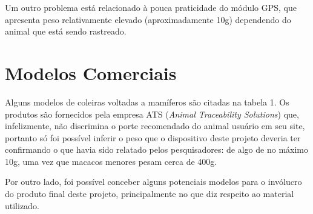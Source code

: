 Um outro problema está relacionado à pouca praticidade do módulo GPS, que apresenta peso relativamente elevado (aproximadamente 10g) dependendo do animal que está sendo rastreado.

\section{Modelos Comerciais}
Alguns modelos de coleiras voltadas a mamíferos são citadas na tabela 1. Os produtos são fornecidos pela empresa ATS (\emph{Animal Traceability Solutions}) \cite{ats} que, infelizmente, não discrimina o porte recomendado do animal usuário em seu site, portanto só foi possível inferir o peso que o dispositivo deste projeto deveria ter confirmando o que havia sido relatado pelos pesquisadores: de algo de no máximo 10g, uma vez que macacos menores pesam cerca de 400g.

Por outro lado, foi possível conceber alguns potenciais modelos para o invólucro do produto final deste projeto, principalmente no que diz respeito ao material utilizado.

